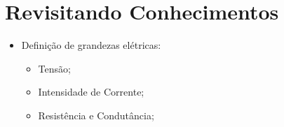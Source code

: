 \section{Revisitando Conhecimentos}
\begin{itemize}
  \item Definição de grandezas elétricas:
  \begin{itemize}
    \item Tensão;
    \item Intensidade de Corrente;
    \item Resistência e Condutância;
  \end{itemize}
\end{itemize}
